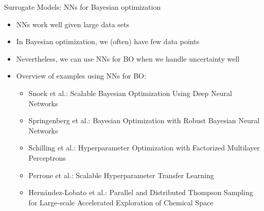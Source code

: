 \begin{frame}[c]{Surrogate Models: NNs for Bayesian optimization}

\begin{itemize}
	\item NNs work well given large data sets
	\item In Bayesian optimization, we (often) have few data points
	\item Nevertheless, we can use NNs for BO when we handle uncertainty well\pause
	\bigskip
	\item Overview of examples using NNs for BO:
	\begin{itemize}
	    \item Snoek et al.: Scalable Bayesian Optimization Using Deep Neural Networks
	    \item Springenberg et al.: Bayesian Optimization with Robust Bayesian Neural Networks
        \item Schilling et al.: Hyperparameter Optimization with Factorized Multilayer Perceptrons
        \item Perrone et al.: Scalable Hyperparameter Transfer Learning
        \item Hern\'andez-Lobato et al.: Parallel and Distributed Thompson Sampling for Large-scale Accelerated Exploration of Chemical Space
	\end{itemize}
\end{itemize}

\end{frame}

